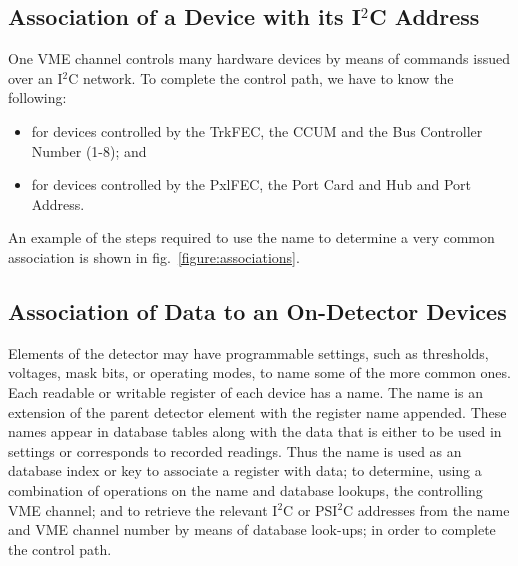 \documentclass{cmspaper}
\begin{document}
\subsection{Association of a Device with its I$^{2}$C Address}

One VME channel controls many hardware devices by means of
commands issued over an I$^{2}$C network. To complete the control path, we have to 
know the following:
\begin{itemize}
\item for devices controlled by the TrkFEC, the CCUM and the Bus Controller
Number (1-8); and
\item for devices controlled by the PxlFEC, the Port Card and Hub and 
Port Address.
\end{itemize}

An example of the steps required to use the name to determine a very
common association is shown in fig.~\ref{figure:associations}.

\subsection{Association of Data to an On-Detector Devices}

Elements of the detector may have programmable settings, such as thresholds,
voltages, mask bits, or operating modes, to name some of the more common ones.
Each readable or writable register of each device has a name. The name is an 
extension of the parent detector element with the register name appended.
These names appear in database tables along with the data that is either to be 
used in settings or corresponds to recorded readings. Thus the name is used
as an database index or key to 
associate a register with data; to determine, using a 
combination of operations on the name and database lookups, the controlling VME
channel; and to retrieve the relevant I$^{2}$C or PSI$^{2}$C addresses
from the name and VME channel number by means of database look-ups;
in order to complete the control path.
\end{document}
